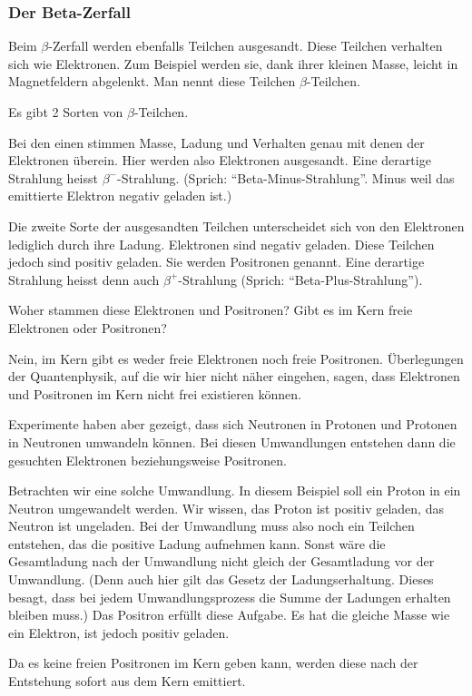 \documentclass[12pt,a4paper,twoside]{article}
\begin{document}
\subsubsection*{Der Beta-Zerfall}


Beim $\beta$-Zerfall werden ebenfalls Teilchen ausgesandt. 
Diese Teilchen verhalten sich wie Elektronen. Zum Beispiel werden sie, dank ihrer kleinen Masse,
leicht in Magnetfeldern abgelenkt. Man nennt diese Teilchen $\beta$-Teilchen.

Es gibt 2 Sorten von $\beta$-Teilchen.

Bei den einen stimmen Masse, Ladung und Verhalten genau mit denen der Elektronen überein.
Hier werden also Elektronen ausgesandt. Eine derartige Strahlung heisst $\beta^-$-Strahlung. 
(Sprich: ``Beta-Minus-Strahlung''. Minus weil das emittierte Elektron negativ geladen ist.)

Die zweite Sorte der ausgesandten Teilchen unterscheidet sich von den Elektronen lediglich durch ihre Ladung. 
Elektronen sind negativ geladen. Diese Teilchen jedoch sind positiv geladen. 
Sie werden Positronen genannt. Eine derartige Strahlung heisst denn auch $\beta^+$-Strahlung 
(Sprich: ``Beta-Plus-Strahlung'').

Woher stammen diese Elektronen und Positronen? Gibt es im Kern freie Elektronen oder Positronen?

Nein, im Kern gibt es weder freie Elektronen noch freie Positronen. 
Überlegungen der Quantenphysik, auf die wir hier nicht näher eingehen, sagen, dass Elektronen und Positronen im Kern nicht frei existieren können.

Experimente haben aber gezeigt, dass sich Neutronen in Protonen und Protonen in Neutronen umwandeln können. 
Bei diesen Umwandlungen entstehen dann die gesuchten Elektronen beziehungsweise Positronen.

Betrachten wir eine solche Umwandlung. In diesem Beispiel soll ein Proton in ein Neutron umgewandelt werden. 
Wir wissen, das Proton ist positiv geladen, das Neutron ist ungeladen. Bei der Umwandlung muss also noch ein Teilchen entstehen,
das die positive Ladung aufnehmen kann. Sonst wäre die Gesamtladung nach der Umwandlung nicht gleich der Gesamtladung vor der Umwandlung.
(Denn auch hier gilt das Gesetz der Ladungserhaltung. Dieses besagt, dass bei jedem Umwandlungsprozess die Summe der Ladungen erhalten bleiben muss.)
Das Positron erfüllt diese Aufgabe. Es hat die gleiche Masse wie ein Elektron, ist jedoch positiv geladen.

Da es keine freien Positronen im Kern geben kann, werden diese nach der Entstehung sofort aus dem Kern emittiert.
\end{document}
